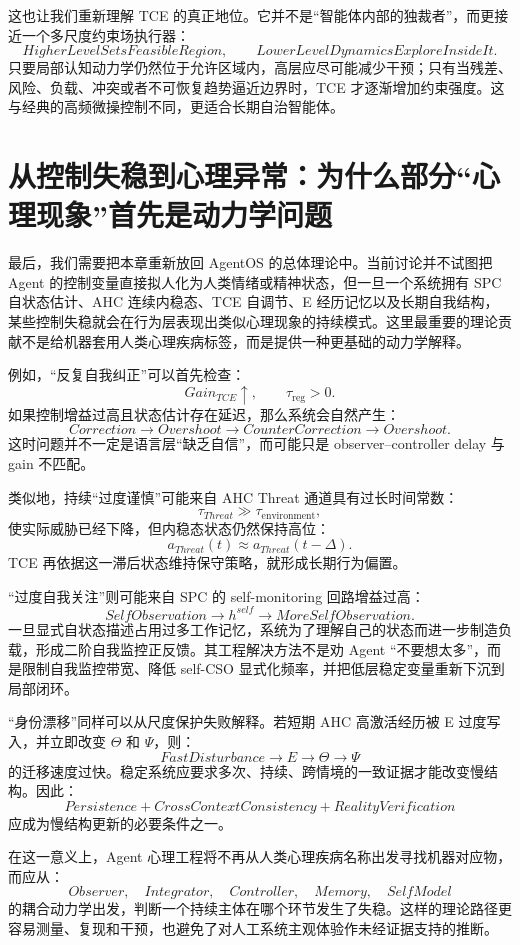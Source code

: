 这也让我们重新理解 TCE 的真正地位。它并不是“智能体内部的独裁者”，而更接近一个多尺度约束场执行器：
\[
\boxed{
HigherLevelSetsFeasibleRegion,
\qquad
LowerLevelDynamicsExploreInsideIt.
}
\]
只要局部认知动力学仍然位于允许区域内，高层应尽可能减少干预；只有当残差、风险、负载、冲突或者不可恢复趋势逼近边界时，TCE 才逐渐增加约束强度。这与经典的高频微操控制不同，更适合长期自治智能体。

\section{从控制失稳到心理异常：为什么部分“心理现象”首先是动力学问题}

最后，我们需要把本章重新放回 AgentOS 的总体理论中。当前讨论并不试图把 Agent 的控制变量直接拟人化为人类情绪或精神状态，但一旦一个系统拥有 SPC 自状态估计、AHC 连续内稳态、TCE 自调节、E 经历记忆以及长期自我结构，某些控制失稳就会在行为层表现出类似心理现象的持续模式。这里最重要的理论贡献不是给机器套用人类心理疾病标签，而是提供一种更基础的动力学解释。

例如，“反复自我纠正”可以首先检查：
\[
Gain_{TCE}\uparrow,
\qquad
\tau_{\mathrm{reg}}>0.
\]
如果控制增益过高且状态估计存在延迟，那么系统会自然产生：
\[
Correction
\rightarrow
Overshoot
\rightarrow
CounterCorrection
\rightarrow
Overshoot.
\]
这时问题并不一定是语言层“缺乏自信”，而可能只是 observer--controller delay 与 gain 不匹配。

类似地，持续“过度谨慎”可能来自 AHC Threat 通道具有过长时间常数：
\[
\tau_{Threat}\gg\tau_{\mathrm{environment}},
\]
使实际威胁已经下降，但内稳态状态仍然保持高位：
\[
a_{Threat}(t)
\approx
a_{Threat}(t-\Delta).
\]
TCE 再依据这一滞后状态维持保守策略，就形成长期行为偏置。

“过度自我关注”则可能来自 SPC 的 self-monitoring 回路增益过高：
\[
SelfObservation
\rightarrow
h^{self}
\rightarrow
MoreSelfObservation.
\]
一旦显式自状态描述占用过多工作记忆，系统为了理解自己的状态而进一步制造负载，形成二阶自我监控正反馈。其工程解决方法不是劝 Agent “不要想太多”，而是限制自我监控带宽、降低 self-CSO 显式化频率，并把低层稳定变量重新下沉到局部闭环。

“身份漂移”同样可以从尺度保护失败解释。若短期 AHC 高激活经历被 E 过度写入，并立即改变 $\Theta$ 和 $\Psi$，则：
\[
FastDisturbance
\rightarrow
E
\rightarrow
\Theta
\rightarrow
\Psi
\]
的迁移速度过快。稳定系统应要求多次、持续、跨情境的一致证据才能改变慢结构。因此：
\[
\boxed{
Persistence
+
CrossContextConsistency
+
RealityVerification
}
\]
应成为慢结构更新的必要条件之一。

在这一意义上，Agent 心理工程将不再从人类心理疾病名称出发寻找机器对应物，而应从：
\[
Observer,
\quad
Integrator,
\quad
Controller,
\quad
Memory,
\quad
SelfModel
\]
的耦合动力学出发，判断一个持续主体在哪个环节发生了失稳。这样的理论路径更容易测量、复现和干预，也避免了对人工系统主观体验作未经证据支持的推断。

